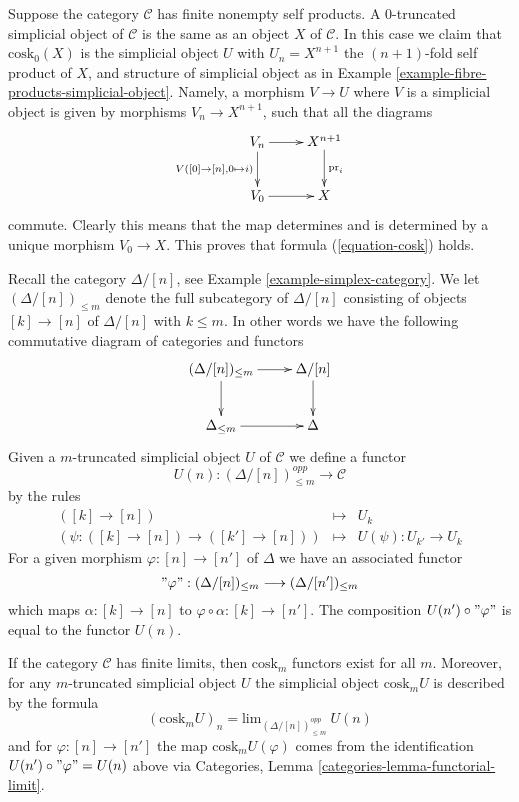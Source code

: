\begin{example}
\label{example-cosk0}
Suppose the category $\mathcal{C}$ has finite nonempty self products.
A $0$-truncated simplicial object of $\mathcal{C}$ is the same
as an object $X$ of $\mathcal{C}$. In this case
we claim that $\text{cosk}_0(X)$ is the simplicial
object $U$ with $U_n = X^{n + 1}$ the $(n + 1)$-fold self
product of $X$, and structure of simplicial object
as in Example \ref{example-fibre-products-simplicial-object}.
Namely, a morphism $V \to U$ where $V$ is a simplicial
object is given by morphisms $V_n \to X^{n + 1}$, such
that all the diagrams
$$
\xymatrix{
V_n \ar[r] \ar[d]_{V([0] \to [n], 0 \mapsto i)} &
X^{n + 1} \ar[d]^{\text{pr}_i} \\
V_0 \ar[r] &
X
}
$$
commute. Clearly this means that the map determines and is determined
by a unique morphism $V_0 \to X$. This proves that formula
(\ref{equation-cosk}) holds.
\end{example}

\noindent
Recall the category $\Delta/[n]$, see Example \ref{example-simplex-category}.
We let $(\Delta/[n])_{\leq m}$ denote the full subcategory
of $\Delta/[n]$ consisting of objects $[k] \to [n]$
of $\Delta/[n]$ with $k \leq m$. In other words we have
the following commutative diagram of categories and functors
$$
\xymatrix{
(\Delta/[n])_{\leq m} \ar[r] \ar[d] &
\Delta/[n] \ar[d] \\
\Delta_{\leq m} \ar[r] &
\Delta
}
$$
Given a $m$-truncated
simplicial object $U$ of $\mathcal{C}$
we define a functor
$$
U(n) : (\Delta/[n])_{\leq m}^{opp} \longrightarrow \mathcal{C}
$$
by the rules
\begin{eqnarray*}
([k] \to [n]) & \longmapsto & U_k \\
(\psi : ([k] \to [n]) \to ([k'] \to [n])) &
\longmapsto &
U(\psi) : U_{k'} \to U_k
\end{eqnarray*}
For a given morphism $\varphi : [n] \to [n']$ of $\Delta$
we have an associated functor
$$
"\varphi" : (\Delta/[n])_{\leq m} \longrightarrow (\Delta/[n'])_{\leq m}
$$
which maps $\alpha : [k] \to [n]$ to
$\varphi \circ \alpha : [k] \to [n']$.
The composition $U(n') \circ "\varphi"$ is
equal to the functor $U(n)$.

\begin{lemma}
\label{lemma-existence-cosk}
If the category $\mathcal{C}$ has finite limits, then
$\text{cosk}_m$ functors exist for all $m$. Moreover,
for any $m$-truncated simplicial object $U$ the
simplicial object $\text{cosk}_mU$ is described
by the formula
$$
(\text{cosk}_mU)_n = \text{lim}_{(\Delta/[n])_{\leq m}^{opp}}\ U(n)
$$
and for $\varphi : [n] \to [n']$ the map
$\text{cosk}_mU(\varphi)$ comes from the
identification $U(n') \circ "\varphi" = U(n)$ above 
via Categories, Lemma \ref{categories-lemma-functorial-limit}.
\end{lemma}

